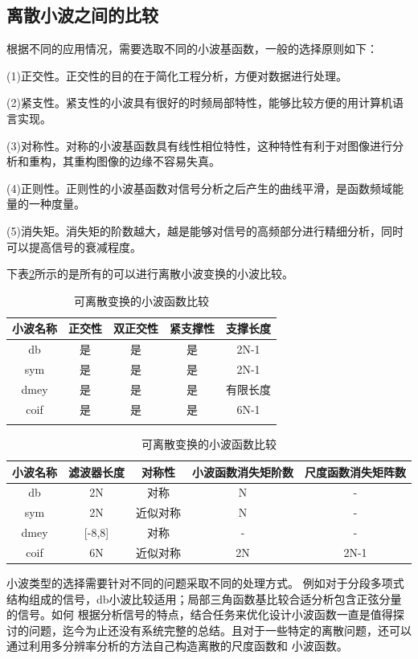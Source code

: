 \subsection{离散小波之间的比较}
根据不同的应用情况，需要选取不同的小波基函数，一般的选择原则如下：
\par (1)正交性。正交性的目的在于简化工程分析，方便对数据进行处理。
\par (2)紧支性。紧支性的小波具有很好的时频局部特性，能够比较方便的用计算机语言实现。
\par (3)对称性。对称的小波基函数具有线性相位特性，这种特性有利于对图像进行分析和重构，其重构图像的边缘不容易失真。
\par (4)正则性。正则性的小波基函数对信号分析之后产生的曲线平滑，是函数频域能量的一种度量。
\par (5)消失矩。消失矩的阶数越大，越是能够对信号的高频部分进行精细分析，同时可以提高信号的衰减程度。\par
下表\ref{tab:lsxb}所示的是所有的可以进行离散小波变换的小波比较\cite{wxf2003}。\par
\begin{table}[!h]
	\centering
	\caption{可离散变换的小波函数比较}
	\label{tab:lsxb}
	\begin{tabular}{|c|c|c|c|c|}
	\hline
	小波名称&正交性&双正交性&紧支撑性&支撑长度\\\hline
	db&是&是&是&2N-1\\\hline
	sym&是&是&是&2N-1\\\hline
	dmey&是&是&是&有限长度\\\hline
	coif&是&是&是&6N-1\\\hline
	\multicolumn{5}{c}{}
	\end{tabular}
	\begin{tabular}{|c|c|c|c|c|}
	\hline
	小波名称&滤波器长度&对称性&小波函数消失矩阶数&尺度函数消失矩阵数\\\hline
	db&2N&对称&N&-\\\hline
	sym&2N&近似对称&N&-\\\hline
	dmey&[-8,8]&对称&-&-\\\hline
	coif&6N&近似对称&2N&2N-1\\\hline
	\end{tabular}
\end{table}
小波类型的选择需要针对不同的问题采取不同的处理方式。
例如对于分段多项式结构组成的信号，db小波比较适用；局部三角函数基比较合适\cite{zyclz2004}分析包含正弦分量的信号。如何
根据分析信号的特点，结合任务来优化设计小波函数一直是值得探讨的问题，迄今为止还没有系统完整的总结。且对于一些特定的离散问题，还可以通过利用多分辨率分析的方法自己构造离散的尺度函数和
小波函数。
